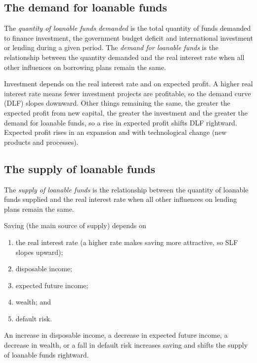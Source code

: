 \subsection{The demand for loanable funds}

\begin{definition}
The \emph{quantity of loanable funds demanded} is the total quantity of funds demanded to
finance investment, the government budget deficit and international investment or
lending during a given period. The \emph{demand for loanable funds} is the relationship
between the quantity demanded and the real interest rate when all other influences on
borrowing plans remain the same.
\end{definition}

Investment depends on the real interest rate and on expected profit. A higher real
interest rate means fewer investment projects are profitable, so the demand curve (DLF)
slopes downward. Other things remaining the same, the greater the expected profit from
new capital, the greater the investment and the greater the demand for loanable funds,
so a rise in expected profit shifts DLF rightward. Expected profit rises in an expansion
and with technological change (new products and processes).

\subsection{The supply of loanable funds}

\begin{definition}
The \emph{supply of loanable funds} is the relationship between the quantity of loanable
funds supplied and the real interest rate when all other influences on lending plans
remain the same.
\end{definition}

Saving (the main source of supply) depends on
\begin{enumerate}
  \item the real interest rate (a higher rate makes saving more attractive, so SLF slopes
        upward);
  \item disposable income;
  \item expected future income;
  \item wealth; and
  \item default risk.
\end{enumerate}
An increase in disposable income, a decrease in expected future income, a decrease in
wealth, or a fall in default risk increases saving and shifts the supply of loanable
funds rightward.

